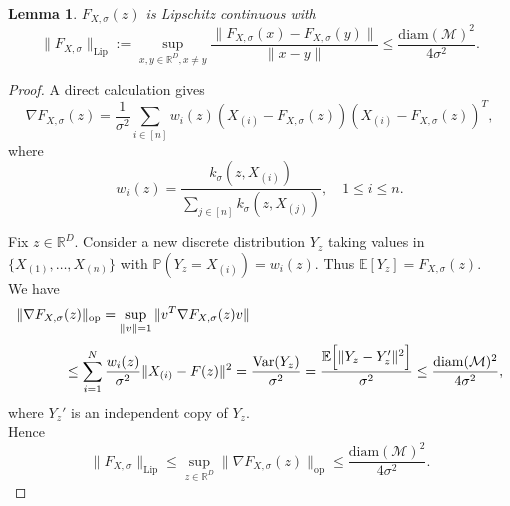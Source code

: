 \documentclass{article}
\newtheorem{lemma}[theorem]{Lemma}
\def\blue{\textcolor{blue}}
\begin{document}
\begin{lemma}
\label{lem:NWLip}
    $F_{X, \sigma}(z)$ is Lipschitz continuous with
\[
\|F_{X, \sigma}\|_{\mathrm{Lip}} := \sup_{x,y \in \mathbb{R}^D, x \ne y} \frac{\|F_{X, \sigma}(x) - F_{X, \sigma}(y)\|}{\|x - y\|} \le \frac{\mathrm{diam}(\mathcal{M})^2}{4 \sigma^2}.
\]

\end{lemma}
\begin{proof}
    A direct calculation gives
\[
\nabla F_{X, \sigma}(z) = \frac{1}{\sigma^2} \sum_{i\in[n]} w_i(z) (X_{(i)} - F_{X,\sigma}(z))(X_{(i)} - F_{X,\sigma}(z))^T,
\]
where
\[
w_i(z) = \frac{k_\sigma(z, X_{(i)})}{\sum_{j\in[n]} k_\sigma(z, X_{(j)})}, \quad 1 \le i \le n.
\]

Fix $z \in \mathbb{R}^D$.  
Consider a new discrete distribution $Y_z$ taking values in $\{X_{(1)}, \dots, X_{(n)}\}$ with $\mathbb{P}(Y_z = X_{(i)}) = w_i(z)$.  
Thus $\mathbb{E}[Y_z] = F_{X,\sigma}(z)$.\\

We have
\begin{align*}
    \|\nabla F_{X, \sigma}&(z)\|_{\mathrm{op}} 
        = \sup_{\|v\|=1} \|v^T \nabla F_{X, \sigma}(z) v\|\\[1mm]
        &\le  \sum_{i=1}^N \frac{w_i(z)}{\sigma^2} \|X_{(i)} - F(z)\|^2= \frac{\mathrm{Var}(Y_z)}{\sigma^2} = \frac{\mathbb{E}\Bigl[\|Y_z - Y_z'\|^2\Bigr]}{\sigma^2} \le \frac{\mathrm{diam}(\mathcal{M})^2}{4 \sigma^2},
    \end{align*}
where $Y_z'$ is an independent copy of $Y_z$.\\

Hence
\[
\|F_{X, \sigma}\|_{\mathrm{Lip}} \le \sup_{z \in \mathbb{R}^D} \|\nabla F_{X, \sigma}(z)\|_{\mathrm{op}} \le \frac{\mathrm{diam}(\mathcal{M})^2}{4 \sigma^2}. 
\]
\end{proof}








\end{document}
